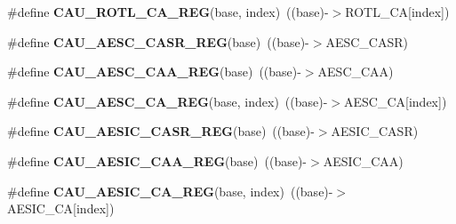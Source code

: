 \begin{DoxyCompactItemize}
\item 
\#define {\bfseries C\+A\+U\+\_\+\+R\+O\+T\+L\+\_\+\+C\+A\+\_\+\+R\+EG}(base,  index)~((base)-\/$>$R\+O\+T\+L\+\_\+\+CA\mbox{[}index\mbox{]})\hypertarget{group__CAU__Register__Accessor__Macros_ga9b63a829f991a7d919f262b0a2850215}{}\label{group__CAU__Register__Accessor__Macros_ga9b63a829f991a7d919f262b0a2850215}

\item 
\#define {\bfseries C\+A\+U\+\_\+\+A\+E\+S\+C\+\_\+\+C\+A\+S\+R\+\_\+\+R\+EG}(base)~((base)-\/$>$A\+E\+S\+C\+\_\+\+C\+A\+SR)\hypertarget{group__CAU__Register__Accessor__Macros_ga425b3f0d5d24cc45dcc3761b0c5056d9}{}\label{group__CAU__Register__Accessor__Macros_ga425b3f0d5d24cc45dcc3761b0c5056d9}

\item 
\#define {\bfseries C\+A\+U\+\_\+\+A\+E\+S\+C\+\_\+\+C\+A\+A\+\_\+\+R\+EG}(base)~((base)-\/$>$A\+E\+S\+C\+\_\+\+C\+AA)\hypertarget{group__CAU__Register__Accessor__Macros_gab22ad099e36a2eec4af64bf79aaa4c45}{}\label{group__CAU__Register__Accessor__Macros_gab22ad099e36a2eec4af64bf79aaa4c45}

\item 
\#define {\bfseries C\+A\+U\+\_\+\+A\+E\+S\+C\+\_\+\+C\+A\+\_\+\+R\+EG}(base,  index)~((base)-\/$>$A\+E\+S\+C\+\_\+\+CA\mbox{[}index\mbox{]})\hypertarget{group__CAU__Register__Accessor__Macros_ga35cc9a69c57defc377319d4eac046f6c}{}\label{group__CAU__Register__Accessor__Macros_ga35cc9a69c57defc377319d4eac046f6c}

\item 
\#define {\bfseries C\+A\+U\+\_\+\+A\+E\+S\+I\+C\+\_\+\+C\+A\+S\+R\+\_\+\+R\+EG}(base)~((base)-\/$>$A\+E\+S\+I\+C\+\_\+\+C\+A\+SR)\hypertarget{group__CAU__Register__Accessor__Macros_gaa59b64b22ea64f2292ed80742f6bef55}{}\label{group__CAU__Register__Accessor__Macros_gaa59b64b22ea64f2292ed80742f6bef55}

\item 
\#define {\bfseries C\+A\+U\+\_\+\+A\+E\+S\+I\+C\+\_\+\+C\+A\+A\+\_\+\+R\+EG}(base)~((base)-\/$>$A\+E\+S\+I\+C\+\_\+\+C\+AA)\hypertarget{group__CAU__Register__Accessor__Macros_ga6ce686ca31f8188aeeaee41939735654}{}\label{group__CAU__Register__Accessor__Macros_ga6ce686ca31f8188aeeaee41939735654}

\item 
\#define {\bfseries C\+A\+U\+\_\+\+A\+E\+S\+I\+C\+\_\+\+C\+A\+\_\+\+R\+EG}(base,  index)~((base)-\/$>$A\+E\+S\+I\+C\+\_\+\+CA\mbox{[}index\mbox{]})\hypertarget{group__CAU__Register__Accessor__Macros_gac784d027048ac8f2ff93707a4cb8631b}{}\label{group__CAU__Register__Accessor__Macros_gac784d027048ac8f2ff93707a4cb8631b}


\end{DoxyCompactItemize}
